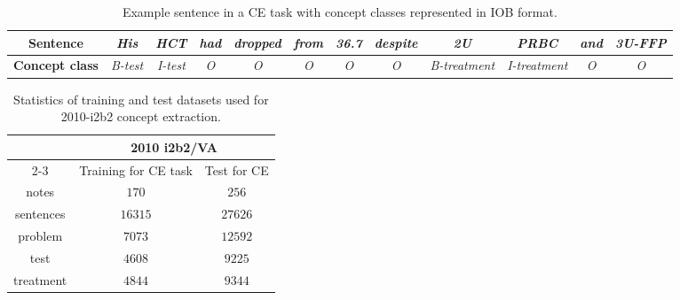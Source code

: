 


 \begin{table*}[ht]
    \small
    \centering

    \begin{tabular}{|c|c|c|c|c|c|c|c|c|c|c|c|}
        \hline \bf Sentence & \textit{His}& \textit{HCT} & \textit{had}& \textit{dropped} & \textit{from} &\textit{36.7} &\textit{despite} &\textit{2U} &\textit{PRBC} &\textit{and} &\textit{3U-FFP} \\
        \hline \textbf{Concept class}& \textit{B-test}& \textit{I-test}& \textit{O} & \textit{O}& \textit{O} & \textit{O} & \textit{ O} & \textit{B-treatment} & \textit{I-treatment} & \textit{O} & \textit{O}\\
        \hline
    \end{tabular}
    \caption{Example sentence in a CE task with concept classes represented in IOB format.}
    \label{table1}
 \end{table*}



 \begin{table*}[ht]
    \centering

        \begin{tabular}{|c|c|c|}
            \hline
            \multirow{3}{*}{} &
            \multicolumn{2}{c|}{\bf {\small 2010 i2b2/VA}} \\
            \cline{2-3}

            & Training for CE task & Test for CE \\
            \hline
            notes &$170$ &$256$  \\
            sentences &$16315$&$27626$\\
            \hline
            problem  & $7073$   & $12592$  \\
            test&  $4608$ & $9225$\\
            treatment& $4844$ & $9344$\\
             \hline
        \end{tabular}
        \caption{Statistics of training and test datasets used for 2010-i2b2 concept extraction.}
        \label{table2}
    \end{table*}

